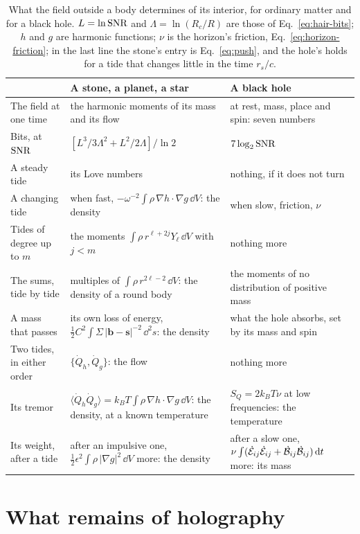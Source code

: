 \begin{table}
\centering
\begin{tabular}{p{}p{}p{}}
 & A stone, a planet, a star & A black hole \\ \hline
The field at one time & the harmonic moments of its mass and its flow & at rest, mass, place and spin: seven numbers \\
Bits, at $\mathrm{SNR}$ & $[L^3/3\Lambda^2 + L^2/2\Lambda]/\ln 2$ & $7\log_2\mathrm{SNR}$ \\
A steady tide & its Love numbers & nothing, if it does not turn \\
A changing tide & when fast, $-\omega^{-2}\int\rho\,\nabla h\cdot\nabla g\,\dd V$: the density & when slow, friction, $\nu$ \\
Tides of degree up to $m$ & the moments $\int\rho\,r^{\ell+2j}Y_\ell\,\dd V$ with $j < m$ & nothing more \\
The sums, tide by tide & multiples of $\int\rho\,r^{2\ell-2}\,\dd V$: the density of a round body & the moments of no distribution of positive mass \\
A mass that passes & its own loss of energy, $\tfrac12C^2\int\Sigma\,|\mathbf b - \mathbf s|^{-2}\,\dd^2s$: the density & what the hole absorbs, set by its mass and spin \\
Two tides, in either order & $\{\dot Q_h, \dot Q_g\}$: the flow & nothing more \\
Its tremor & $\langle\dot Q_h\dot Q_g\rangle = k_BT\int\rho\,\nabla h\cdot\nabla g\,\dd V$: the density, at a known temperature & $S_Q = 2k_BT\nu$ at low frequencies: the temperature \\
Its weight, after a tide & after an impulsive one, $\tfrac12\epsilon^2\int\rho\,|\nabla g|^2\,\dd V$ more: the density & after a slow one, $\nu\int(\dot{\mathcal{E}}_{ij}\dot{\mathcal{E}}_{ij} + \dot{\mathcal{B}}_{ij}\dot{\mathcal{B}}_{ij})\,\mathrm{d} t$ more: its mass \\
\end{tabular}
\caption{What the field outside a body determines of its interior, for ordinary matter
and for a black hole. $L = \ln\mathrm{SNR}$ and $\Lambda = \ln(R_c/R)$ are those of
Eq.~\eqref{eq:hair-bits}; $h$ and $g$ are harmonic functions; $\nu$ is the
horizon's friction, Eq.~\eqref{eq:horizon-friction}; in the last line the
stone's entry is Eq.~\eqref{eq:push}, and the hole's holds for a tide that
changes little in the time $r_s/c$.}\label{tab:hair}
\end{table}

\section{What remains of holography}\label{sec:holography}

